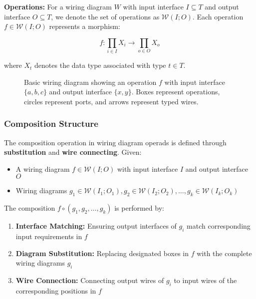 \textbf{Operations:} For a wiring diagram $W$ with input interface $I \subseteq T$ and output interface $O \subseteq T$, we denote the set of operations as $\mathcal{W}(I; O)$. Each operation $f \in \mathcal{W}(I; O)$ represents a morphism:

\begin{equation}
    f: \prod_{i \in I} X_i \to \prod_{o \in O} X_o
\end{equation}

where $X_t$ denotes the data type associated with type $t \in T$.

\begin{figure}[h]
\centering

\caption{Basic wiring diagram showing an operation $f$ with input interface $\{a,b,c\}$ and output interface $\{x,y\}$. Boxes represent operations, circles represent ports, and arrows represent typed wires.}
\label{fig:wiring-diagram-basic}
\end{figure}

\subsubsection{Composition Structure}

The composition operation in wiring diagram operads is defined through \textbf{substitution} and \textbf{wire connecting}. Given:
\begin{itemize}
    \item A wiring diagram $f \in \mathcal{W}(I; O)$ with input interface $I$ and output interface $O$
    \item Wiring diagrams $g_1 \in \mathcal{W}(I_1; O_1), g_2 \in \mathcal{W}(I_2; O_2), \ldots, g_k \in \mathcal{W}(I_k; O_k)$
\end{itemize}

The composition $f \circ (g_1, g_2, \ldots, g_k)$ is performed by:

\begin{enumerate}
    \item \textbf{Interface Matching:} Ensuring output interfaces of $g_i$ match corresponding input requirements in $f$
    \item \textbf{Diagram Substitution:} Replacing designated boxes in $f$ with the complete wiring diagrams $g_i$
    \item \textbf{Wire Connection:} Connecting output wires of $g_i$ to input wires of the corresponding positions in $f$
\end{enumerate}

